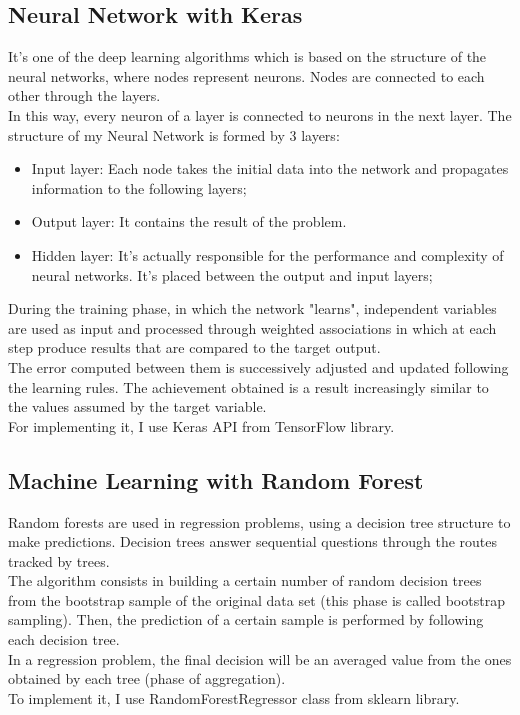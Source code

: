 \subsection{Neural Network with Keras}
It's one of the deep learning algorithms which is based on the structure of the neural networks, where nodes represent neurons.
Nodes are connected to each other through the layers. \\
In this way, every neuron of a layer is connected to neurons in the next layer.
The structure of my Neural Network is formed by 3 layers:
\begin{itemize}
    \item Input layer: Each node takes the initial data into the network and propagates information to the following layers;
    \item Output layer: It contains the result of the problem. 
    \item Hidden layer: It's actually responsible for the performance and complexity of neural networks. It's placed between the output and input layers;
\end{itemize}
During the training phase, in which the network "learns", independent variables are used as input and processed through weighted associations in which at each step produce results that are compared to the target output.\\ The error computed between them is successively adjusted and updated following the learning rules. The achievement obtained is a result increasingly similar to the values assumed by the target variable.\\ 
For implementing it, I use Keras API from TensorFlow library.


\subsection{Machine Learning with Random Forest}
Random forests are used in regression problems, using a decision tree structure to make predictions. Decision trees answer sequential questions through the routes tracked by trees.\\
The algorithm consists in building a certain number of random decision trees from the bootstrap sample of the original data set (this phase is called bootstrap sampling). Then, the prediction of a certain sample is performed by following each decision tree. \\In a regression problem, the final decision will be an averaged value from the ones obtained by each tree (phase of aggregation).\\
To implement it, I use RandomForestRegressor class from sklearn library. 


